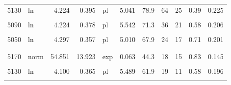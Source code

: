 \documentclass[
  12pt,
]{book}
\begin{document}
\begin{landscape}
\begin{table}
\begin{tabular}[t]{llrrlrrrrrr}
\hspace{1em}5130 & ln & 4.224 & 0.395 & pl & 5.041 & 78.9 & 64 & 25 & 0.39 & 0.225\\
\hspace{1em}\cellcolor{gray!6}{5110} & \cellcolor{gray!6}{ln} & \cellcolor{gray!6}{4.281} & \cellcolor{gray!6}{0.368} & \cellcolor{gray!6}{pl} & \cellcolor{gray!6}{4.907} & \cellcolor{gray!6}{81.3} & \cellcolor{gray!6}{49} & \cellcolor{gray!6}{19} & \cellcolor{gray!6}{0.39} & \cellcolor{gray!6}{0.215}\\
\hspace{1em}5090 & ln & 4.224 & 0.378 & pl & 5.542 & 71.3 & 36 & 21 & 0.58 & 0.206\\
\hspace{1em}\cellcolor{gray!6}{5070} & \cellcolor{gray!6}{norm} & \cellcolor{gray!6}{75.086} & \cellcolor{gray!6}{25.864} & \cellcolor{gray!6}{exp} & \cellcolor{gray!6}{0.044} & \cellcolor{gray!6}{70.0} & \cellcolor{gray!6}{22} & \cellcolor{gray!6}{14} & \cellcolor{gray!6}{0.64} & \cellcolor{gray!6}{0.197}\\
\hspace{1em}5050 & ln & 4.297 & 0.357 & pl & 5.010 & 67.9 & 24 & 17 & 0.71 & 0.201\\
\addlinespace[0.3em]
\multicolumn{11}{l}{\textbf{Vráble SW*}}\\
\hspace{1em}\cellcolor{gray!6}{5190} & \cellcolor{gray!6}{norm} & \cellcolor{gray!6}{53.755} & \cellcolor{gray!6}{14.740} & \cellcolor{gray!6}{pl} & \cellcolor{gray!6}{7.911} & \cellcolor{gray!6}{52.9} & \cellcolor{gray!6}{10} & \cellcolor{gray!6}{7} & \cellcolor{gray!6}{0.70} & \cellcolor{gray!6}{0.151}\\
\hspace{1em}5170 & norm & 54.851 & 13.923 & exp & 0.063 & 44.3 & 18 & 15 & 0.83 & 0.145\\
\hspace{1em}\cellcolor{gray!6}{5150} & \cellcolor{gray!6}{ln} & \cellcolor{gray!6}{4.186} & \cellcolor{gray!6}{0.375} & \cellcolor{gray!6}{pl} & \cellcolor{gray!6}{8.045} & \cellcolor{gray!6}{87.1} & \cellcolor{gray!6}{13} & \cellcolor{gray!6}{5} & \cellcolor{gray!6}{0.38} & \cellcolor{gray!6}{0.213}\\
\hspace{1em}5130 & ln & 4.100 & 0.365 & pl & 5.489 & 61.9 & 19 & 11 & 0.58 & 0.196\\
\hspace{1em}\cellcolor{gray!6}{5110} & \cellcolor{gray!6}{norm} & \cellcolor{gray!6}{58.895} & \cellcolor{gray!6}{10.918} & \cellcolor{gray!6}{exp} & \cellcolor{gray!6}{0.074} & \cellcolor{gray!6}{48.2} & \cellcolor{gray!6}{13} & \cellcolor{gray!6}{12} & \cellcolor{gray!6}{0.92} & \cellcolor{gray!6}{0.103}\\
\bottomrule
\end{tabular}
\end{table}
\end{landscape}
\end{document}
